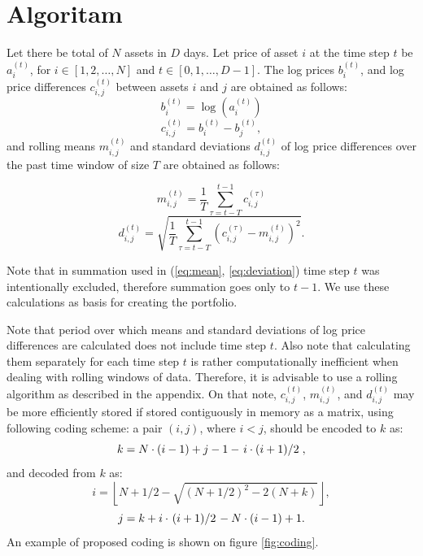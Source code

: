 \documentclass[lmodern, utf8, diplomski, numeric]{fer}
\begin{document}
  
\chapter{Algoritam}

  Let there be total of $N$ assets in $D$ days.
  Let price of asset $i$ at the time step $t$ be $a_i^{(t)}$, for $i \in {\left[1, 2, \ldots, N\right]}$ and $t \in {\left[0, 1, \ldots, D-1\right]}$.
  The log prices $b_i^{(t)}$, and log price differences $c_{i,j}^{(t)}$ between assets $i$ and $j$ are obtained as follows:
  \begin{equation} b_i^{(t)} = \log\left(a_i^{(t)}\right) \end{equation}
  \begin{equation} c_{i,j}^{(t)} = b_i^{(t)} - b_j^{(t)}, \end{equation}
  and rolling means $m_{i,j}^{(t)}$ and standard deviations $d_{i,j}^{(t)}$ of log price differences over the past time window of size $T$ are obtained as follows:
  
  \begin{equation}
  \label{eq:mean}
  m_{i,j}^{(t)} = \frac{1}{T}\sum_{\tau = t - T}^{t - 1} c_{i,j}^{(\tau)}
  \end{equation}
  \begin{equation}
  \label{eq:deviation}
  d_{i,j}^{(t)} = \sqrt{\frac{1}{T}\sum_{\tau=t - T}^{t - 1} \left(c_{i,j}^{(\tau)} - m_{i,j}^{(t)} \right)^2}.
  \end{equation}
  
  Note that in summation used in (\ref{eq:mean}, \ref{eq:deviation}) time step $t$ was intentionally excluded, therefore summation goes only to $t - 1$.
  We use these calculations as basis for creating the portfolio.

  Note that period over which means and standard deviations of log price differences are calculated does not include time step $t$.
  Also note that calculating them separately for each time step $t$ is rather computationally inefficient when dealing with rolling windows of data.
  Therefore, it is advisable to use a rolling algorithm as described in the appendix.
  On that note, $c_{i,j}^{(t)}$, $m_{i,j}^{(t)}$, and $d_{i,j}^{(t)}$ may be more efficiently stored if stored contiguously in memory as a matrix, using following coding scheme: a pair $(i, j)$, where $i < j$, should be encoded to $k$ as:
  \begin{equation} k = N \cdot (i - 1) + j - 1 - \left. i \cdot (i + 1) \middle/ 2\right., \end{equation}
  and decoded from $k$ as:
  \begin{equation} i = \left\lfloor N + 1/2 - \sqrt{(N + 1/2)^2 - 2(N + k)} \right\rfloor, \end{equation}
  \begin{equation} j = k + i \cdot \left.(i + 1) \middle/ 2\right. - N \cdot (i - 1) + 1. \end{equation}
  An example of proposed coding is shown on figure \ref{fig:coding}.
  
\end{document}

